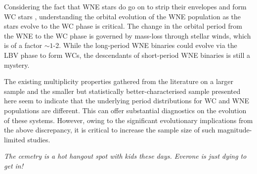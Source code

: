 

Considering the fact that WNE stars do go on to strip their envelopes and form WC stars \citep{2003MeynetMaeder}, understanding the orbital evolution of the WNE population as the stars evolve to the WC phase is critical. The change in the orbital period from the WNE to the WC phase is governed by mass-loss through stellar winds, which is of a factor ${\sim}1$-2. While the long-period WNE binaries could evolve via the LBV phase to form WCs, the descendants of short-period WNE binaries is still a mystery.

The existing multiplicity properties gathered from the literature on a larger sample and the smaller but statistically better-characterised sample presented here seem to indicate that the underlying period distributions for WC and WNE populations are different. This can offer substantial diagnostics on the evolution of these systems. However, owing to the significant evolutionary implications from the above discrepancy, it is critical to increase the sample size of such magnitude-limited studies.

\clearpage
\thispagestyle{empty}
\hspace{0pt}
\vfill
\textit{The cemetry is a hot hangout spot with kids these days. Everone is just dying to get in!}
\vfill
\clearpage
